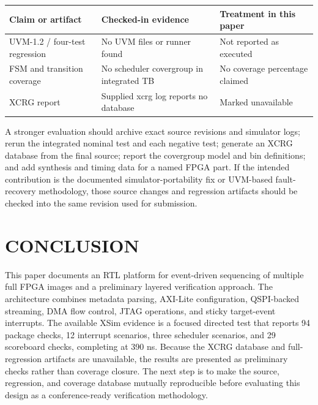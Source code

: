 \documentclass[conference]{IEEEtran}
\begin{document}
\begin{center}
\scriptsize
\setlength{\tabcolsep}{2.5pt}
\renewcommand{\arraystretch}{1.08}
\begin{tabularx}{\columnwidth}{@{}>{\raggedright\arraybackslash}p{}>{\raggedright\arraybackslash}p{}>{\raggedright\arraybackslash}X@{}}
\toprule
\textbf{Claim or artifact} & \textbf{Checked-in evidence} & \textbf{Treatment in this paper} \\
\midrule
UVM-1.2 / four-test regression & No UVM files or runner found & Not reported as executed \\
FSM and transition coverage & No scheduler covergroup in integrated TB & No coverage percentage claimed \\
XCRG report & Supplied xcrg log reports no database & Marked unavailable \\
\bottomrule
\end{tabularx}
\end{center}


A stronger evaluation should archive exact source revisions and simulator logs; rerun the integrated nominal test and each negative test; generate an XCRG database from the final source; report the covergroup model and bin definitions; and add synthesis and timing data for a named FPGA part. If the intended contribution is the documented simulator-portability fix or UVM-based fault-recovery methodology, those source changes and regression artifacts should be checked into the same revision used for submission.

\section{CONCLUSION}

This paper documents an RTL platform for event-driven sequencing of multiple full FPGA images and a preliminary layered verification approach. The architecture combines metadata parsing, AXI-Lite configuration, QSPI-backed streaming, DMA flow control, JTAG operations, and sticky target-event interrupts. The available XSim evidence is a focused directed test that reports 94 package checks, 12 interrupt scenarios, three scheduler scenarios, and 29 scoreboard checks, completing at 390 ns. Because the XCRG database and full-regression artifacts are unavailable, the results are presented as preliminary checks rather than coverage closure. The next step is to make the source, regression, and coverage database mutually reproducible before evaluating this design as a conference-ready verification methodology.
\end{document}
